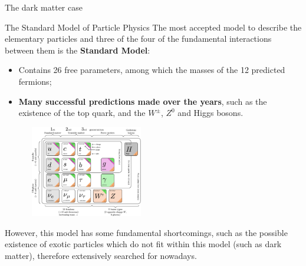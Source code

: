 \documentclass[8pt]{beamer}
\begin{document}
\begin{frame}[standout]
The dark matter case
\end{frame}

\begin{frame}{The Standard Model of Particle Physics}
\justifying
The most accepted model to describe the elementary particles and three of the four of the fundamental interactions between them is the \textbf{Standard Model}:

\begin{itemize}
\justifying
\item Contains 26 free parameters, among which the masses of the 12 predicted fermions;
\item \textbf{Many successful predictions made over the years}, such as the existence of the top quark, and the $W^{\pm}$, $Z^{0}$ and Higgs bosons.
\end{itemize} \vfill

\begin{figure}[htbp]
\begin{center}
\includegraphics[width=5.2cm, height=4cm]{figs/SMFermions.png}
\end{center}
\end{figure} \vfill

However, \alert{this model has some fundamental shortcomings}, such as the possible existence of exotic particles which do not fit within this model (such as dark matter), therefore extensively searched for nowadays. \vfill
\end{frame}
\end{document}
